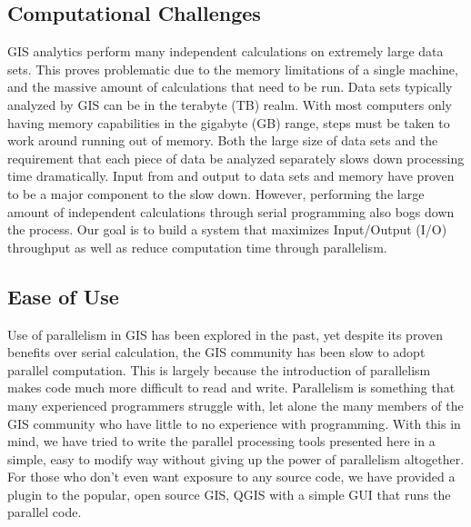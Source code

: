 \documentclass[journal]{IEEEtran}
\begin{document}
    \subsection{Computational Challenges}
    GIS analytics perform many independent calculations on extremely large data
    sets. This proves problematic due to the memory limitations of a single
    machine, and the massive amount of calculations that need to be run. Data sets 
    typically analyzed by GIS can be in the terabyte (TB) realm. With
    most computers only having memory capabilities in the gigabyte (GB) range,
    steps must be taken to work around running out of memory. Both the large size
    of data sets and the requirement that each piece of data be analyzed separately
    slows down processing time dramatically. Input from and output to data sets
    and memory have proven to be a major component to the slow down.  However,
    performing the large amount of independent calculations through serial
    programming also bogs down the process. Our goal is to build a system that
    maximizes Input/Output (I/O) throughput as well as reduce computation time
    through parallelism.

    \subsection{Ease of Use}
    Use of parallelism in GIS has been explored in the past, yet despite its proven
    benefits over serial calculation, the GIS community has been slow to adopt
    parallel computation. This is largely because the introduction of parallelism
    makes code much more difficult to read and write. Parallelism is something that
    many experienced programmers struggle with, let alone the many members of the
    GIS community who have little to no experience with programming. With this in
    mind, we have tried to write the parallel processing tools presented here in a
    simple, easy to modify way without giving up the power of parallelism
    altogether.  For those who don't even want exposure to any source code, we
    have provided a plugin to the popular, open source GIS, QGIS with a simple
    GUI that runs the parallel code.
\end{document}
